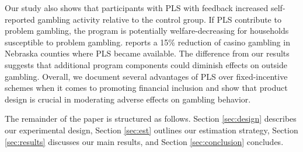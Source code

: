 \documentclass[11pt]{article}
\begin{document}

	Our study also shows that participants with PLS with feedback increased self-reported gambling activity relative to the control group. If PLS contribute to problem gambling, the program is potentially welfare-decreasing for households susceptible to problem gambling. \textcite{cookson_when_2016} reports a 15\% reduction of casino gambling in Nebraska counties where PLS became available. The difference from our results suggests that additional program components could diminish effects on outside gambling. Overall, we document several advantages of PLS over fixed-incentive schemes when it comes to promoting financial inclusion and show that product design is crucial in moderating adverse effects on gambling behavior.


	The remainder of the paper is structured as follows. Section \ref{sec:design} describes our experimental design, Section \ref{sec:est} outlines our estimation strategy, Section \ref{sec:results} discusses our main results, and Section \ref{sec:conclusion} concludes.





\end{document}
